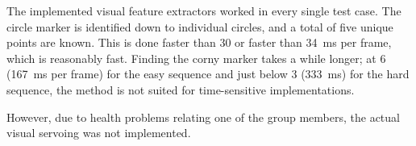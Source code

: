 
The implemented visual feature extractors worked in every single test case.
The circle marker is identified down to individual circles, and a total of five unique points are known.
This is done faster than \SI{30}{\fps} or faster than \SI{34}{\milli\second} per frame, which is reasonably fast.
Finding the corny marker takes a while longer;
at \SI{6}{\fps} (\SI{167}{\milli\second} per frame) for the easy sequence and just below \SI{3}{\fps} (\SI{333}{\milli\second}) for the hard sequence,
the method is not suited for time-sensitive implementations.

However, due to health problems relating one of the group members, the actual visual servoing was not implemented.
